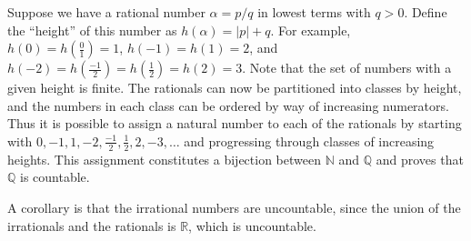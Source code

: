 \documentclass{article}
\begin{document}
Suppose we have a rational number $\alpha = p/q$ in lowest terms with $q>0$. Define the ``height'' of this number as $h(\alpha) = |p| + q$. For example, $h(0) = h(\frac{0}{1}) = 1$, $h(-1) = h(1) = 2$, and $h(-2) = h(\frac{-1}{2}) = h(\frac{1}{2}) = h(2) = 3.$ Note that the set of numbers with a given height is finite. The rationals can now be partitioned into classes by height, and the numbers in each class can be ordered by way of increasing numerators. Thus it is possible to assign a natural number to each of the rationals by starting with $0, -1, 1, -2, \frac{-1}{2}, \frac{1}{2}, 2, -3, \ldots$ and progressing through classes of increasing heights. This assignment constitutes a bijection between $\mathbb{N}$ and $\mathbb{Q}$ and proves that $\mathbb{Q}$ is countable.

A corollary is that the irrational numbers are uncountable, since the union of the irrationals and the rationals is $\mathbb{R}$, which is uncountable.
\end{document}
